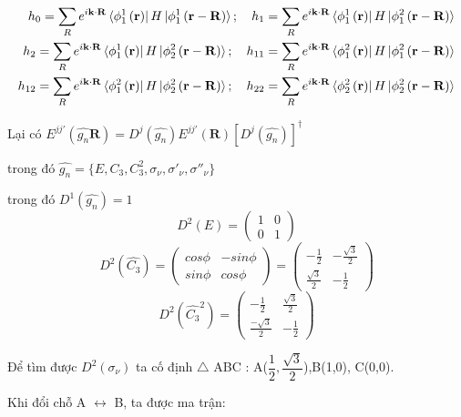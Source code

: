 \documentclass{article}
\begin{document}
\begin{align*}
	h_0 = \sum_{R} e^{i\mathbf{k\cdot R}} \bra*{\phi_1^1 \left(\mathbf{r}\right)} H \ket*{\phi_1^1\left(\mathbf{r}-\mathbf{R}\right)}; \quad h_1 = \sum_{R} e^{i\mathbf{k\cdot R}} \bra*{\phi_1^1 \left(\mathbf{r}\right)} H \ket*{\phi_1^2\left(\mathbf{r}-\mathbf{R}\right)}     \\
	h_2 = \sum_{R} e^{i\mathbf{k\cdot R}} \bra*{\phi_1^1 \left(\mathbf{r}\right)} H \ket*{\phi_2^2\left(\mathbf{r}-\mathbf{R}\right)}; \quad  h_{11} = \sum_{R} e^{i\mathbf{k\cdot R}} \bra*{\phi_1^2 \left(\mathbf{r}\right)} H \ket*{\phi_1^2\left(\mathbf{r}-\mathbf{R}\right)} \\
	h_{12} = \sum_{R} e^{i\mathbf{k\cdot R}} \bra*{\phi_1^2 \left(\mathbf{r}\right)} H \ket*{\phi_2^2\left(\mathbf{r}-\mathbf{R}\right)}; \quad h_{22} = \sum_{R} e^{i\mathbf{k\cdot R}} \bra*{\phi_2^2 \left(\mathbf{r}\right)} H \ket*{\phi_2^2\left(\mathbf{r}-\mathbf{R}\right)}
\end{align*}

Lại có $E^{jj'} \left(\hat{g_n}\textbf{R}\right)= D^j(\hat{g_n}) E^{jj'}
	\left(\textbf{R}\right)\left[D^j(\hat{g_n})\right]^{\dagger}$

trong đó $\hat{g_n} = \{E,C_3,C^2_3,\sigma_\nu,\sigma'_\nu,\sigma''_\nu\}$

trong đó $D^1(\hat{g_n}) = 1$
\[
	\renewcommand{\arraystretch}{0.75}
	D^2(E) = \begin{pmatrix}
		1 & 0 \\
		0 & 1
	\end{pmatrix}
\]
\[
	\renewcommand{\arraystretch}{0.75}
	D^2(\hat{C_3}) = \begin{pmatrix}
		cos\phi & -sin\phi \\
		sin\phi & cos\phi
	\end{pmatrix}
	= \begin{pmatrix}
		-\frac{1}{2}       & -\frac{\sqrt{3}}{2} \\
		\frac{\sqrt{3}}{2} & -\frac{1}{2}
	\end{pmatrix}
\]
\[
	\renewcommand{\arraystretch}{0.75}
	D^2(\hat{C_3}^2) =
	\begin{pmatrix}
		-\frac{1}{2}        & \frac{\sqrt{3}}{2} \\
		\frac{-\sqrt{3}}{2} & -\frac{1}{2}
	\end{pmatrix}
\]

Để tìm được $D^2(\sigma_\nu)$ ta cố định $\bigtriangleup$ ABC : A($\dfrac{1}{2},\dfrac{\sqrt{3}}{2}$),B(1,0), C(0,0).

Khi đổi chỗ A $\leftrightarrow$ B, ta được ma trận:
\end{document}
